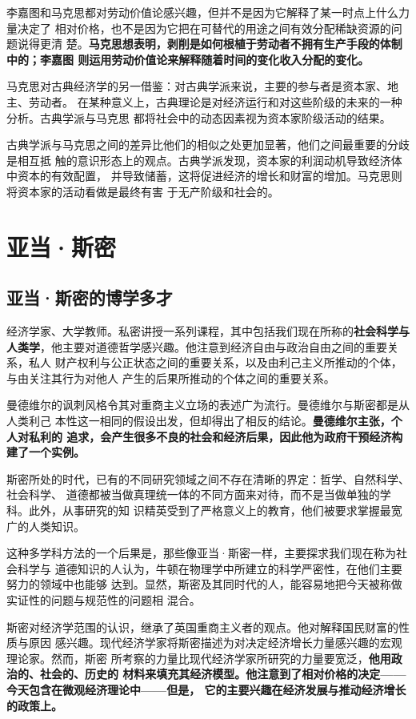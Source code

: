 李嘉图和马克思都对劳动价值论感兴趣，但并不是因为它解释了某一时点上什么力量决定了
相对价格，也不是因为它把在可替代的用途之间有效分配稀缺资源的问题说得更清
楚。\textbf{马克思想表明，剥削是如何根植于劳动者不拥有生产手段的体制中的；李嘉图
  则运用劳动价值论来解释随着时间的变化收入分配的变化。}

马克思对古典经济学的另一借鉴：对古典学派来说，主要的参与者是资本家、地主、劳动者。
在某种意义上，古典理论是对经济运行和对这些阶级的未来的一种分析。古典学派与马克思
都将社会中的动态因素视为资本家阶级活动的结果。

古典学派与马克思之间的差异比他们的相似之处更加显著，他们之间最重要的分歧是相互抵
触的意识形态上的观点。古典学派发现，资本家的利润动机导致经济体中资本的有效配置，
并导致储蓄，这将促进经济的增长和财富的增加。马克思则将资本家的活动看做是最终有害
于无产阶级和社会的。

\chapter{亚当·斯密}

\section{亚当·斯密的博学多才}

经济学家、大学教师。私密讲授一系列课程，其中包括我们现在所称的\textbf{社会科学与
  人类学}，他主要对道德哲学感兴趣。他注意到经济自由与政治自由之间的重要关系，私人
财产权利与公正状态之间的重要关系，以及由利己主义所推动的个体，与由关注其行为对他人
产生的后果所推动的个体之间的重要关系。

曼德维尔的讽刺风格令其对重商主义立场的表述广为流行。曼德维尔与斯密都是从人类利己
本性这一相同的假设出发，但却得出了相反的结论。\textbf{曼德维尔主张，个人对私利的
  追求，会产生很多不良的社会和经济后果，因此他为政府干预经济构建了一个实例。}

斯密所处的时代，已有的不同研究领域之间不存在清晰的界定：哲学、自然科学、社会科学、
道德都被当做真理统一体的不同方面来对待，而不是当做单独的学科。此外，从事研究的知
识精英受到了严格意义上的教育，他们被要求掌握最宽广的人类知识。

这种多学科方法的一个后果是，那些像亚当·斯密一样，主要探求我们现在称为社会科学与
道德知识的人认为，牛顿在物理学中所建立的科学严密性，在他们主要努力的领域中也能够
达到。显然，斯密及其同时代的人，能容易地把今天被称做实证性的问题与规范性的问题相
混合。

斯密对经济学范围的认识，继承了英国重商主义者的观点。他对解释国民财富的性质与原因
感兴趣。现代经济学家将斯密描述为对决定经济增长力量感兴趣的宏观理论家。然而，斯密
所考察的力量比现代经济学家所研究的力量要宽泛，\textbf{他用政治的、社会的、历史的
  材料来填充其经济模型。他注意到了相对价格的决定——今天包含在微观经济理论中——但是，
  它的主要兴趣在经济发展与推动经济增长的政策上。}

